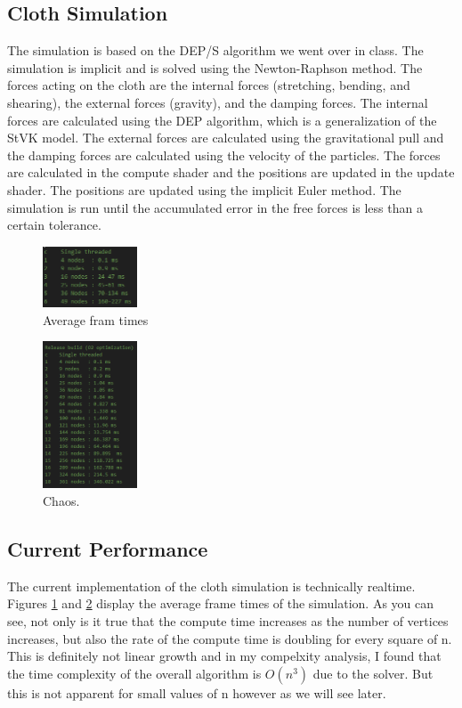 \documentclass[letterpaper, 10 pt, conference]{ieeeconf}  %
\begin{document}
\subsection{Cloth Simulation}
The simulation is based on the DEP/S algorithm we went over in class. The simulation is implicit and is solved using the Newton-Raphson method. The forces acting on the cloth are the internal forces (stretching, bending, and shearing), the external forces (gravity), and the damping forces. The internal forces are calculated using the DEP algorithm, which is a generalization of the StVK model. The external forces are calculated using the gravitational pull and the damping forces are calculated using the velocity of the particles. The forces are calculated in the compute shader and the positions are updated in the update shader. The positions are updated using the implicit Euler method. The simulation is run until the accumulated error in the free forces is less than a certain tolerance.

\begin{figure}[!ht]
        \centering
        \includegraphics[width=0.25\textwidth,keepaspectratio]{timing_debug.PNG}
        \caption{Average fram times }
        \label{"fig:timing_debug"}
\end{figure}

\begin{figure}[!ht]
        \centering
        \includegraphics[width=0.25\textwidth,keepaspectratio]{timing_release.PNG}
        \caption{Chaos.}
        \label{"fig:timing_release"}
\end{figure}


\subsection{Current Performance}
The current implementation of the cloth simulation is technically realtime. Figures \ref{"fig:timing_debug"} and \ref{"fig:timing_release"} display the average frame times of the simulation. As you can see, not only is it true that the compute time increases as the number of vertices increases, but also the rate of the compute time is doubling for every square of n. This is definitely not linear growth and in my compelxity analysis, I found that the time complexity of the overall algorithm is $O(n^3)$ due to the solver. But this is not apparent for small values of n however as we will see later.
\end{document}
